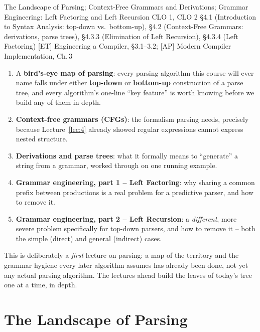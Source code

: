 \documentclass[full-course-notes.tex]{subfiles}
\begin{document}
  {The Landscape of Parsing; Context-Free Grammars and Derivations; Grammar Engineering:
   Left Factoring and Left Recursion}
  {CLO 1, CLO 2}
  {\S4.1 (Introduction to Syntax Analysis: top-down vs.\ bottom-up), \S4.2 (Context-Free
   Grammars: derivations, parse trees), \S4.3.3 (Elimination of Left Recursion), \S4.3.4
   (Left Factoring)}
  {[ET] Engineering a Compiler, \S3.1--3.2; [AP] Modern Compiler Implementation, Ch.\,3}
\setcounter{section}{0}
\makelecturetitle

\begin{coreidea}
\begin{enumerate}
  \item A \textbf{bird's-eye map of parsing}: every parsing algorithm this course will ever
  name falls under either \textbf{top-down} or \textbf{bottom-up} construction of a parse
  tree, and every algorithm's one-line ``key feature'' is worth knowing before we build any of
  them in depth.
  \item \textbf{Context-free grammars (CFGs)}: the formalism parsing needs, precisely because
  Lecture~\ref{lec:4} already showed regular expressions cannot express nested structure.
  \item \textbf{Derivations and parse trees}: what it formally means to ``generate'' a string
  from a grammar, worked through on one running example.
  \item \textbf{Grammar engineering, part 1 -- Left Factoring}: why sharing a common prefix
  between productions is a real problem for a predictive parser, and how to remove it.
  \item \textbf{Grammar engineering, part 2 -- Left Recursion}: a \emph{different}, more severe
  problem specifically for top-down parsers, and how to remove it -- both the simple (direct)
  and general (indirect) cases.
\end{enumerate}
This is deliberately a \emph{first} lecture on parsing: a map of the territory and the grammar
hygiene every later algorithm assumes has already been done, not yet any actual parsing
algorithm. The lectures ahead build the leaves of today's tree one at a time, in depth.
\end{coreidea}

\section{The Landscape of Parsing}
\label{sec:l8-landscape}
\end{document}
